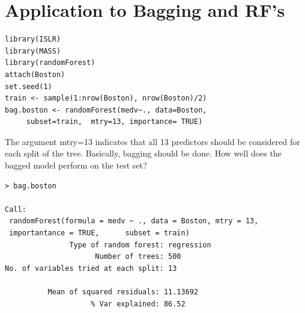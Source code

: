 \documentclass[aspectratio=1610]{beamer}
\theoremstyle{example}
\theoremstyle{definition}
\theoremstyle{rem}
\theoremstyle{theorm}
\begin{document}
\section{Application to Bagging and RF's}


\begin{frame}[fragile]
\scriptsize
\begin{verbatim}
library(ISLR)
library(MASS)
library(randomForest)
attach(Boston)
set.seed(1)
train <- sample(1:nrow(Boston), nrow(Boston)/2)
bag.boston <- randomForest(medv~., data=Boston, 
     subset=train,  mtry=13, importance= TRUE)
\end{verbatim}
The argument mtry=13 indicates that all 13 predictors should be considered for each split of the tree. Basically, bagging 
should be done. How well does the bagged model perform on the test set?
\end{frame}

\begin{frame}[fragile]
\scriptsize
\begin{verbatim}
> bag.boston

Call:
 randomForest(formula = medv ~ ., data = Boston, mtry = 13, 
 importantance = TRUE,      subset = train) 
               Type of random forest: regression
                     Number of trees: 500
No. of variables tried at each split: 13

          Mean of squared residuals: 11.13692
                    % Var explained: 86.52
\end{verbatim}

\end{frame}
\end{document}
